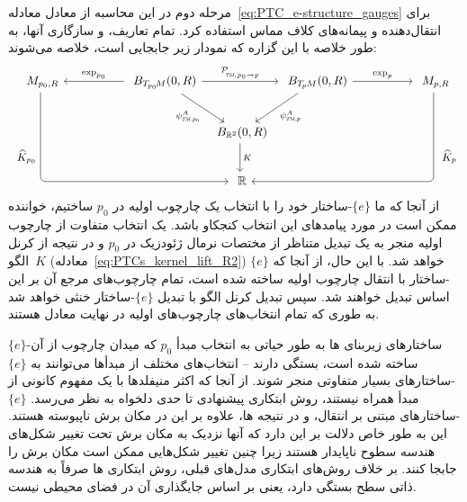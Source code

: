مرحله دوم در این محاسبه از معادل معادله~\eqref{eq:PTC_e-structure_gauges} برای انتقال‌دهنده و پیمانه‌های کلاف مماس استفاده کرد.
تمام تعاریف، و سازگاری آنها، به طور خلاصه با این گزاره که نمودار زیر جابجایی است، خلاصه می‌شوند:
\begin{equation}\label{cd:PTC_kernel_2}
\begin{tikzcd}[column sep=50, row sep=24, font=\normalsize]
    M_{p_0,R}
        \arrow[ddrr, rounded corners, to path={ 
            |-node[left, pos=.36]{\small$\widehat{K}_{p_0}$} ([xshift=-5.ex]\tikztotarget.west) 
            -- (\tikztotarget.west)
            }]
    & B_{T_{\mkern-1.mu p_0}\!M}(0,R)
        \arrow[l, "\exp_{p_0}"']
        \arrow[rr, "\mathcal{P}_{\mkern-2mu\overset{}{\protect\scalebox{.6}{$\!T\!M$}\mkern-2mu,\mkern1mu p_0\to p}}"]
        \arrow[dr, "\psi_{\protect\scalebox{.6}{$T\!M,$}\protect\scalebox{.7}{$p_0$}}^A"']
    &[-45pt]
    &[-45pt]
      B_{\TpM}(0,R)
        \arrow[dl, "\psiTMp^A"]
        \arrow[r, "\exp_p"]
    & M_{p,R}
        \arrow[ddll, rounded corners, to path={ 
            |-node[right, pos=.36]{\small$\widehat{K}_p$} ([xshift=5.ex]\tikztotarget.east) 
            -- (\tikztotarget.east)
            }]
    \\
    & & B_{\R^2}(0,R)
        \arrow[d, "K"]
    \\
    & & \R
\end{tikzcd}
\end{equation}
از آنجا که ما $\{e\}$-ساختار خود را با انتخاب یک چارچوب اولیه در $p_0$ ساختیم، خواننده ممکن است در مورد پیامدهای این انتخاب کنجکاو باشد.
یک انتخاب متفاوت از چارچوب اولیه منجر به یک تبدیل متناظر از مختصات نرمال ژئودزیک در $p_0$ و در نتیجه از کرنل الگو~$K$ (معادله~\eqref{eq:PTCs_kernel_lift_R2}) خواهد شد.
با این حال، از آنجا که $\{e\}$-ساختار با انتقال چارچوب اولیه ساخته شده است، تمام چارچوب‌های مرجع آن بر این اساس تبدیل خواهند شد.
سپس تبدیل کرنل الگو با تبدیل $\{e\}$-ساختار خنثی خواهد شد به طوری که تمام انتخاب‌های چارچوب‌های اولیه در نهایت معادل هستند.


$\{e\}$-ساختارهای زیربنای ها به طور حیاتی به انتخاب مبدأ $p_0$ که میدان چارچوب از آن ساخته شده است، بستگی دارند
-- انتخاب‌های مختلف از مبدأها می‌توانند به $\{e\}$-ساختارهای بسیار متفاوتی منجر شوند.
از آنجا که اکثر منیفلدها با یک مفهوم کانونی از مبدأ همراه نیستند، روش ابتکاری پیشنهادی تا حدی دلخواه به نظر می‌رسد.
$\{e\}$-ساختارهای مبتنی بر انتقال، و در نتیجه ها، علاوه بر این در مکان برش ناپیوسته هستند.
این به طور خاص دلالت بر این دارد که آنها نزدیک به مکان برش تحت تغییر شکل‌های هندسه سطوح ناپایدار هستند زیرا چنین تغییر شکل‌هایی ممکن است مکان برش را جابجا کنند.
بر خلاف روش‌های ابتکاری مدل‌های قبلی، روش ابتکاری ها صرفاً به هندسه ذاتی سطح بستگی دارد، یعنی بر اساس جایگذاری آن در فضای محیطی نیست.



